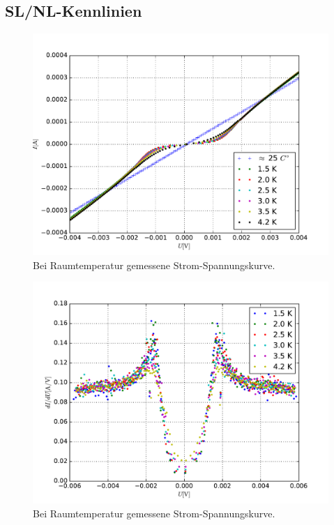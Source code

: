 \documentclass[twoside,        %
               BCOR12mm,       %
               english,ngerman, %
               fleqn,headsepline=false,footsepline=false
              ]{Vorlage/MFPREPORT}
\begin{document}
\subsection{SL/NL-Kennlinien}
\begin{figure}[]
    \centering
    \includegraphics[width=\textwidth]{fig/2.pdf}
    \caption{Bei Raumtemperatur gemessene Strom-Spannungskurve.}
    \label{fig:2}
\end{figure}
\begin{figure}[]
    \centering
    \includegraphics[width=\textwidth]{fig/3.pdf}
    \caption{Bei Raumtemperatur gemessene Strom-Spannungskurve.}
    \label{fig:3}
\end{figure}
\end{document}
